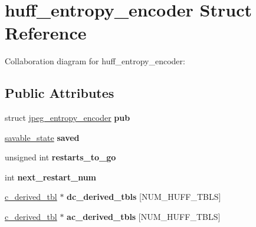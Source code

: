 \hypertarget{structhuff__entropy__encoder}{\section{huff\+\_\+entropy\+\_\+encoder Struct Reference}
\label{structhuff__entropy__encoder}
}


Collaboration diagram for huff\+\_\+entropy\+\_\+encoder\+:
\subsection*{Public Attributes}
\begin{DoxyCompactItemize}
\item 
\hypertarget{structhuff__entropy__encoder_a1a7606509ffbd9efd4c611af433879e0}{struct \hyperlink{structjpeg__entropy__encoder}{jpeg\+\_\+entropy\+\_\+encoder} {\bfseries pub}}\label{structhuff__entropy__encoder_a1a7606509ffbd9efd4c611af433879e0}

\item 
\hypertarget{structhuff__entropy__encoder_ac27e136d5c3baca34bafde2053d91ad0}{\hyperlink{structsavable__state}{savable\+\_\+state} {\bfseries saved}}\label{structhuff__entropy__encoder_ac27e136d5c3baca34bafde2053d91ad0}

\item 
\hypertarget{structhuff__entropy__encoder_a6c999079a14022f2610081d420c36513}{unsigned int {\bfseries restarts\+\_\+to\+\_\+go}}\label{structhuff__entropy__encoder_a6c999079a14022f2610081d420c36513}

\item 
\hypertarget{structhuff__entropy__encoder_ad6a426b0d41e9d06359bcc57481c891b}{int {\bfseries next\+\_\+restart\+\_\+num}}\label{structhuff__entropy__encoder_ad6a426b0d41e9d06359bcc57481c891b}

\item 
\hypertarget{structhuff__entropy__encoder_a6264cf74944972824cea6639229bdebe}{\hyperlink{structc__derived__tbl}{c\+\_\+derived\+\_\+tbl} $\ast$ {\bfseries dc\+\_\+derived\+\_\+tbls} \mbox{[}N\+U\+M\+\_\+\+H\+U\+F\+F\+\_\+\+T\+B\+L\+S\mbox{]}}\label{structhuff__entropy__encoder_a6264cf74944972824cea6639229bdebe}

\item 
\hypertarget{structhuff__entropy__encoder_a0b67beb3a73da24b5d09693f3c0c8b22}{\hyperlink{structc__derived__tbl}{c\+\_\+derived\+\_\+tbl} $\ast$ {\bfseries ac\+\_\+derived\+\_\+tbls} \mbox{[}N\+U\+M\+\_\+\+H\+U\+F\+F\+\_\+\+T\+B\+L\+S\mbox{]}}\label{structhuff__entropy__encoder_a0b67beb3a73da24b5d09693f3c0c8b22}


\end{DoxyCompactItemize}
